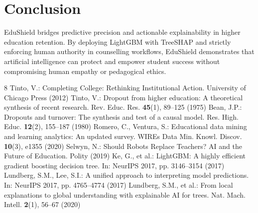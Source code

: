\documentclass[runningheads]{llncs}
\begin{document}
\section{Conclusion}
EduShield bridges predictive precision and actionable explainability in higher education retention. By deploying LightGBM with TreeSHAP and strictly enforcing human authority in counselling workflows, EduShield demonstrates that artificial intelligence can protect and empower student success without compromising human empathy or pedagogical ethics.

\begin{thebibliography}{8}
 Tinto, V.: Completing College: Rethinking Institutional Action. University of Chicago Press (2012)
 Tinto, V.: Dropout from higher education: A theoretical synthesis of recent research. Rev. Educ. Res. \textbf{45}(1), 89--125 (1975)
 Bean, J.P.: Dropouts and turnover: The synthesis and test of a causal model. Res. High. Educ. \textbf{12}(2), 155--187 (1980)
 Romero, C., Ventura, S.: Educational data mining and learning analytics: An updated survey. WIREs Data Min. Knowl. Discov. \textbf{10}(3), e1355 (2020)
 Selwyn, N.: Should Robots Replace Teachers? AI and the Future of Education. Polity (2019)
 Ke, G., et al.: LightGBM: A highly efficient gradient boosting decision tree. In: NeurIPS 2017, pp. 3146--3154 (2017)
 Lundberg, S.M., Lee, S.I.: A unified approach to interpreting model predictions. In: NeurIPS 2017, pp. 4765--4774 (2017)
 Lundberg, S.M., et al.: From local explanations to global understanding with explainable AI for trees. Nat. Mach. Intell. \textbf{2}(1), 56--67 (2020)
\end{thebibliography}
\end{document}
